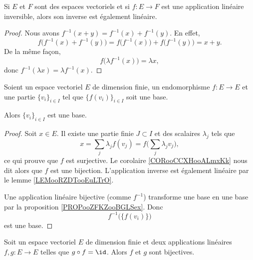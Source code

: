 \begin{lemma}       \label{LEMooRZDTooEuLTrO}
	Si \( E\) et \( F\) sont des espaces vectoriels et si \( f\colon E\to F\) est une application linéaire inversible, alors son inverse est également linéaire.
\end{lemma}

\begin{proof}
	Nous avons \( f^{-1}(x+y)=f^{-1}(x)+f^{-1}(y)\). En effet,
	\begin{equation}
		f\big( f^{-1}(x)+f^{-1}(y) \big)=f\big( f^{-1}(x) \big)+f\big( f^{-1}(y) \big)=x+y.
	\end{equation}
	De la même façon,
	\begin{equation}
		f\big( \lambda f^{-1}(x) \big)=\lambda x,
	\end{equation}
	donc \( f^{-1}(\lambda x)=\lambda f^{-1}(x)\).
\end{proof}

\begin{proposition}     \label{PROPooHLUYooNsDgbn}
	Soient un espace vectoriel \( E\) de dimension finie, un endomorphisme \( f\colon E\to E\) et une partie \( \{v_i\}_{i\in I}\) tel que \( \{f(v_i)\}_{i\in I}\) soit une base.

	Alors \( \{v_i\}_{i\in I}\) est une base.
\end{proposition}

\begin{proof}
	Soit \( x\in E\). Il existe une partie finie \( J\subset I\) et des scalaires \( \lambda_j\) tels que
	\begin{equation}
		x=\sum_j\lambda_jf(v_j)=f\big( \sum_j\lambda_jv_j \big),
	\end{equation}
	ce qui prouve que \( f\) est surjective. Le corolaire \ref{CORooCCXHooALmxKk} nous dit alors que \( f\) est une bijection. L'application inverse est également linéaire par le lemme \ref{LEMooRZDTooEuLTrO}.

	Une application linéaire bijective (comme \( f^{-1}\)) transforme une base en une base par la proposition \ref{PROPooZFKZooBGLSex}. Donc
	\begin{equation}
		f^{-1}\big( \{f(v_i)\} \big)
	\end{equation}
	est une base.
\end{proof}

\begin{proposition}     \label{PROPooADESooATJSrH}
	Soit un espace vectoriel \( E\) de dimension finie et deux applications linéaires \( f,g\colon E\to E\) telles que \( g\circ f=\id\). Alors \( f\) et \( g\) sont bijectives.
\end{proposition}

